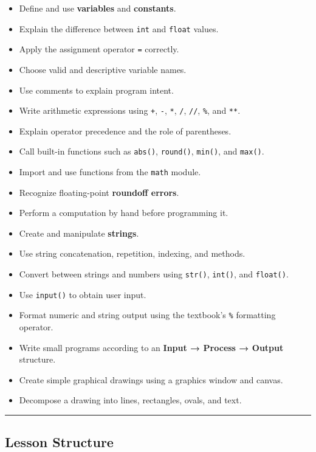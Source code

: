 \documentclass[
]{article}
\providecommand{\tightlist}{%
  \setlength{\itemsep}{0pt}\setlength{\parskip}{0pt}}
\begin{document}
\begin{itemize}
\tightlist
\item
  Define and use \textbf{variables} and \textbf{constants}.
\item
  Explain the difference between \texttt{int} and \texttt{float} values.
\item
  Apply the assignment operator \texttt{=} correctly.
\item
  Choose valid and descriptive variable names.
\item
  Use comments to explain program intent.
\item
  Write arithmetic expressions using \texttt{+}, \texttt{-}, \texttt{*},
  \texttt{/}, \texttt{//}, \texttt{\%}, and \texttt{**}.
\item
  Explain operator precedence and the role of parentheses.
\item
  Call built-in functions such as \texttt{abs()}, \texttt{round()},
  \texttt{min()}, and \texttt{max()}.
\item
  Import and use functions from the \texttt{math} module.
\item
  Recognize floating-point \textbf{roundoff errors}.
\item
  Perform a computation by hand before programming it.
\item
  Create and manipulate \textbf{strings}.
\item
  Use string concatenation, repetition, indexing, and methods.
\item
  Convert between strings and numbers using \texttt{str()},
  \texttt{int()}, and \texttt{float()}.
\item
  Use \texttt{input()} to obtain user input.
\item
  Format numeric and string output using the textbook's \texttt{\%}
  formatting operator.
\item
  Write small programs according to an \textbf{Input → Process → Output}
  structure.
\item
  Create simple graphical drawings using a graphics window and canvas.
\item
  Decompose a drawing into lines, rectangles, ovals, and text.
\end{itemize}

\begin{center}\rule{0.5\linewidth}{0.5pt}\end{center}

\subsection{Lesson Structure}\label{lesson-structure}
\end{document}
